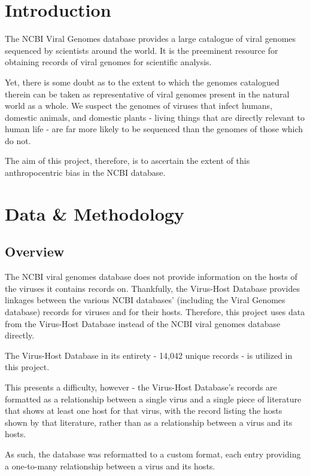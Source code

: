 \documentclass[12pt]{article}
\begin{document}
    \section{Introduction}

    The NCBI Viral Genomes database provides a large catalogue of viral genomes 
    sequenced by scientists around the world. It is the preeminent resource for
    obtaining records of viral genomes for scientific analysis.

    Yet, there is some doubt as to the extent to which the genomes catalogued
    therein can be taken as representative of viral genomes present in the
    natural world as a whole. We suspect the genomes of viruses that infect
    humans, domestic animals, and domestic plants - living things that are
    directly relevant to human life - are far more likely to be sequenced than
    the genomes of those which do not.

    The aim of this project, therefore, is to ascertain the extent of this
    anthropocentric bias in the NCBI database.

    \section{Data \& Methodology}
    
    \subsection{Overview}

    The NCBI viral genomes database does not provide information on the hosts
    of the viruses it contains records on. Thankfully, the Virus-Host Database provides
    linkages between the various NCBI databases' (including the Viral Genomes
    database) records for viruses and for their hosts. Therefore,
    this project uses data from the Virus-Host Database instead of the NCBI viral
    genomes database directly.

    The Virus-Host Database in its entirety - 14,042 unique records - is utilized in
    this project.

    This presents a difficulty, however - the Virus-Host Database's records are
    formatted as a relationship between a single virus and a single piece of
    literature that shows at least one host for that virus, with the record listing
    the hosts shown by that literature, rather than as a relationship between a
    virus and its hosts.

    As such, the database was reformatted to a custom format, each entry providing
    a one-to-many relationship between a virus and its hosts.
\end{document}
